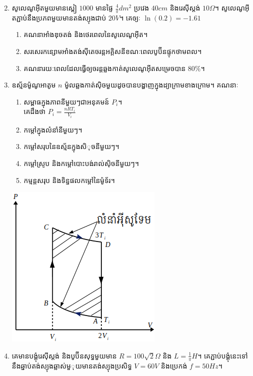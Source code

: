\documentclass{officialexam}
\begin{document}
\begin{enumerate}[I]
\begin{multicols}{2}
	\end{multicols}
	\item សូលេណូអុីតមួយមានស្ពៀ $1000$ មានផ្ទៃ $\frac{4}{\pi}dm^{2}$ ប្រវេង $40cm$ និងរេសុីស្តង់ $10\Omega$។ សូលេណូអុីតភ្ជាប់នឹងប្រភពមួយមានតង់ស្យុងជាប់ $20V$។ គេឲ្យៈ $\ln\left(0.2\right)=-1.61$
	\begin{enumerate}[k]
		\item គណនាអាំងឌុចតង់ និងថេរពេលនៃសូលេណូអុីត។
		\item សរសេរកន្សោមអាំងតង់សុីតេចរន្តអគ្គិសនីខណៈពេលបូប៊ីនផ្ទុកថាមពល។
		\item គណនារយៈពេលដែលធ្វើឲ្យចរន្តឆ្លងកាត់សូលេណូអុីតសម្រេចបាន $80\%$។
	\end{enumerate}
	\item ឧស្ម័នម៉ូណូអាតូម $n$ ម៉ូលឆ្លងកាត់សុិចមួយដូចបានបង្ហាញក្នុងដ្យាក្រាមខាងក្រោម។ គណនាៈ
	\begin{multicols}{2}
		\begin{enumerate}[k]
			\item សម្ពាធក្នុងភាពនីមួយៗជាអនុគមន៍ $P_{i}$។
			\\គេដឹងថា $P_{i}=\frac{nRT_{i}}{V_{i}}$
			\item កម្តៅក្នុងលំនាំនីមួយៗ។
			\item កម្តៅសរុបនៃឧស្ម័នក្នុងសិុចនីមួយៗ។
			\item កម្តៅស្រូប និងកម្តៅបោះបង់រាល់សុិចនីមួយៗ។
			\item កម្មន្តសរុប និងទិន្នផលកម្តៅនៃម៉ូទ័រ។
		\end{enumerate}
		\includegraphics[scale=0.7]{image14}
	\end{multicols}\newpage
	\item គេមានបង្គុំរេសុីស្តង់ និងបូប៊ីនសុទ្ធមួយមាន $R=100\sqrt{2}\Omega$ និង $L=\frac{1}{\pi}H$។ គេភ្ជាប់បង្គុំនេះទៅនឹងឆ្នាប់តង់ស្យុងឆ្លាស់មួុយមានតង់ស្យុងប្រសិទ្ធ $V=60V$ និងប្រេកង់ $f=50Hz$។

\end{enumerate}
\end{document}

